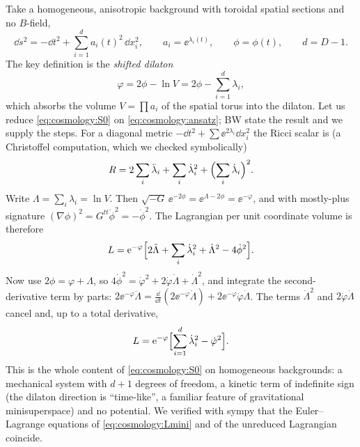 Take a homogeneous, anisotropic background with toroidal spatial sections and no $B$-field,
\begin{equation}\label{eq:cosmology:ansatz}
 \dd s^2=-\dd t^2+\sum_{i=1}^{d}a_i(t)^2\,\dd x_i^2,\qquad a_i=\ee^{\lambda_i(t)},\qquad
 \phi=\phi(t),\qquad d=D-1 .
\end{equation}
The key definition is the \emph{shifted dilaton}
\begin{equation}\label{eq:cosmology:shifted}
 \varphi=2\phi-\ln V=2\phi-\sum_{i=1}^d\lambda_i ,
\end{equation}
which absorbs the volume $V=\prod a_i$ of the spatial torus into the dilaton. Let us reduce
\eqref{eq:cosmology:S0} on \eqref{eq:cosmology:ansatz}; BW state the result and we supply the
steps. For a diagonal metric $-\dd t^2+\sum\ee^{2\lambda_i}\dd x_i^2$ the Ricci scalar is
(a Christoffel computation, which we checked symbolically)
\begin{equation}\label{eq:cosmology:ricci}
 R=2\sum_i\ddot\lambda_i+\sum_i\dot\lambda_i^2+\Bigl(\sum_i\dot\lambda_i\Bigr)^2 .
\end{equation}
Write $\Lambda=\sum_i\lambda_i=\ln V$. Then $\sqrt{-G}\,\ee^{-2\phi}=\ee^{\Lambda-2\phi}=\ee^{-\varphi}$,
and with mostly-plus signature $(\nabla\phi)^2=G^{tt}\dot\phi^2=-\dot\phi^2$. The Lagrangian per unit
coordinate volume is therefore
\[
 L=\mathrm{e}^{-\varphi}\Bigl[2\ddot\Lambda+\sum_i\dot\lambda_i^2+\dot\Lambda^2-4\dot\phi^2\Bigr].
\]
Now use $2\phi=\varphi+\Lambda$, so $4\dot\phi^2=\dot\varphi^2+2\dot\varphi\dot\Lambda+\dot\Lambda^2$,
and integrate the second-derivative term by parts:
$2\ee^{-\varphi}\ddot\Lambda=\frac{\dd}{\dd t}(2\ee^{-\varphi}\dot\Lambda)+2\ee^{-\varphi}\dot\varphi\dot\Lambda$.
The terms $\dot\Lambda^2$ and $2\dot\varphi\dot\Lambda$ cancel and, up to a total derivative,
\begin{equation}\label{eq:cosmology:Lmini}
 L=\mathrm{e}^{-\varphi}\Bigl[\sum_{i=1}^d\dot\lambda_i^2-\dot\varphi^2\Bigr].
\end{equation}
This is the whole content of \eqref{eq:cosmology:S0} on homogeneous backgrounds: a
mechanical system with $d+1$ degrees of freedom, a kinetic term of indefinite sign (the
dilaton direction is ``time-like'', a familiar feature of gravitational minisuperspace) and
no potential. We verified with sympy that the Euler--Lagrange equations of
\eqref{eq:cosmology:Lmini} and of the unreduced Lagrangian coincide.

